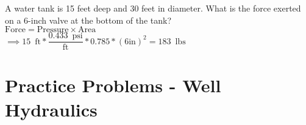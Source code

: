 \item A water tank is 15 feet deep and 30 feet in diameter. What is the force exerted on a 6-inch valve at the bottom of the tank?\\
\vspace{0.5cm}
$\textrm{Force}= \textrm{Pressure} \times \textrm{Area}$\\
\vspace{0.5cm}
$\implies 15 \enspace\mathrm{ft}* \dfrac{0.433 \enspace \mathrm{psi}}{\mathrm{ft}}*0.785 *(6 \mathrm{in})^2 =\boxed{183 \enspace\mathrm{lbs}}$\\



\section*{Practice Problems - Well Hydraulics}

